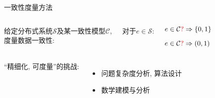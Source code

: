 \begin{frame}{一致性度量方法}
  \begin{columns}
	  给定分布式系统$\mathcal{S}$及某一致性模型$\mathcal{C}$, \\度量数据一致性:

	  \pause
	  \vspace{0.50cm}

	  对于$e \in \mathcal{S}$:
	  \begin{description}
		\setlength{\itemsep}{6pt}
		\item[验证 (verify):] $e \in \mathcal{C} \textcolor{red}{\mathbf{?}} \Rightarrow \{0,1\}$ 
		\item[量化 (quantify):] $e \in \mathcal{C} \textcolor{red}{\mathbf{?}} \Rightarrow (0,1)$ 
	  \end{description}
  \end{columns}

  \pause
  \vspace{0.80cm}

  \begin{columns}
	  ``精细化, 可度量''的挑战:
	  \begin{itemize}
		\item 问题复杂度分析, 算法设计
		\item 数学建模与分析
	  \end{itemize}
  \end{columns}
\end{frame}
